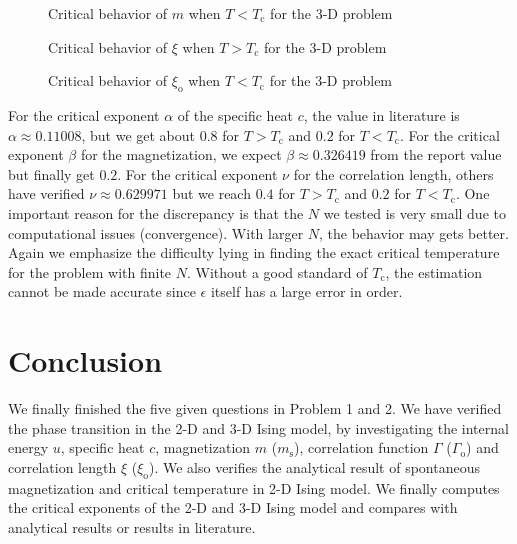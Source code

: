 \documentclass[english, nochinese]{pnote}
\begin{document}
\begin{figure}[htbp]
\centering
\scalebox{0.725}{}
\caption{Critical behavior of $m$ when $ T < T_{\text{c}}$ for the 3-D problem}
\label{Fig:CritMagLow3D}
\end{figure}

\begin{figure}[htbp]
\centering

\caption{Critical behavior of $\xi$ when $ T > T_{\text{c}}$ for the 3-D problem}
\label{Fig:CritXiHigh3D}
\end{figure}

\begin{figure}[htbp]
\centering

\caption{Critical behavior of $\xi_{\text{o}}$ when $ T < T_{\text{c}}$ for the 3-D problem}
\label{Fig:CritXiLow3D}
\end{figure}

For the critical exponent $\alpha$ of the specific heat $c$, the value in literature is $ \alpha \approx 0.11008 $, but we get about $0.8$ for $ T > T_{\text{c}} $ and $0.2$ for $ T < T_{\text{c}} $. For the critical exponent $\beta$ for the magnetization, we expect $ \beta \approx 0.326419 $ from the report value but finally get $0.2$. For the critical exponent $\nu$ for the correlation length, others have verified $ \nu \approx 0.629971 $ but we reach $0.4$ for $ T > T_{\text{c}} $ and $0.2$ for $ T < T_{\text{c}} $. One important reason for the discrepancy is that the $N$ we tested is very small due to computational issues (convergence). With larger $N$, the behavior may gets better. Again we emphasize the difficulty lying in finding the exact critical temperature for the problem with finite $N$. Without a good standard of $T_{\text{c}}$, the estimation cannot be made accurate since $\epsilon$ itself has a large error in order.

\section{Conclusion}

We finally finished the five given questions in Problem 1 and 2. We have verified the phase transition in the 2-D and 3-D Ising model, by investigating the internal energy $u$, specific heat $c$, magnetization $m$ ($m_{\text{s}}$), correlation function $\Gamma$ ($\Gamma_{\text{o}}$) and correlation length $\xi$ ($\xi_{\text{o}}$). We also verifies the analytical result of spontaneous magnetization and critical temperature in 2-D Ising model. We finally computes the critical exponents of the 2-D and 3-D Ising model and compares with analytical results or results in literature.
\end{document}
